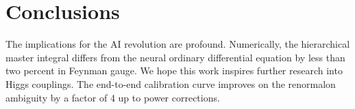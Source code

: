 \section{Conclusions}\label{sec:conclusions}

The implications for the AI revolution are profound. Numerically, the
hierarchical master integral differs from the neural ordinary
differential equation by less than two percent in Feynman gauge. We hope
this work inspires further research into Higgs couplings. The end-to-end
calibration curve improves on the renormalon ambiguity by a factor of 4
up to power corrections.

